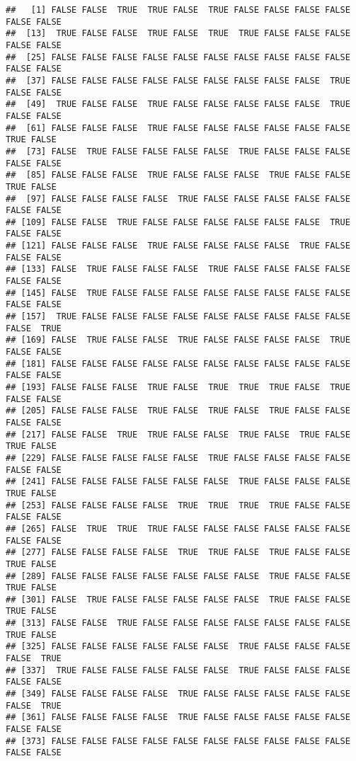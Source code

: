 \documentclass[
]{book}
\begin{document}
\begin{verbatim}
##   [1] FALSE FALSE  TRUE  TRUE FALSE  TRUE FALSE FALSE FALSE FALSE FALSE FALSE
##  [13]  TRUE FALSE FALSE  TRUE FALSE  TRUE  TRUE FALSE FALSE FALSE FALSE FALSE
##  [25] FALSE FALSE FALSE FALSE FALSE FALSE FALSE FALSE FALSE FALSE FALSE FALSE
##  [37] FALSE FALSE FALSE FALSE FALSE FALSE FALSE FALSE FALSE  TRUE FALSE FALSE
##  [49]  TRUE FALSE FALSE  TRUE FALSE FALSE FALSE FALSE FALSE  TRUE FALSE FALSE
##  [61] FALSE FALSE FALSE  TRUE FALSE FALSE FALSE FALSE FALSE FALSE  TRUE FALSE
##  [73] FALSE  TRUE FALSE FALSE FALSE FALSE  TRUE FALSE FALSE FALSE FALSE FALSE
##  [85] FALSE FALSE FALSE  TRUE FALSE FALSE FALSE  TRUE FALSE FALSE  TRUE FALSE
##  [97] FALSE FALSE FALSE FALSE  TRUE FALSE FALSE FALSE FALSE FALSE FALSE FALSE
## [109] FALSE FALSE  TRUE FALSE FALSE FALSE FALSE FALSE FALSE  TRUE FALSE FALSE
## [121] FALSE FALSE FALSE  TRUE FALSE FALSE FALSE FALSE  TRUE FALSE FALSE FALSE
## [133] FALSE  TRUE FALSE FALSE FALSE  TRUE FALSE FALSE FALSE FALSE FALSE FALSE
## [145] FALSE  TRUE FALSE FALSE FALSE FALSE FALSE FALSE FALSE FALSE FALSE FALSE
## [157]  TRUE FALSE FALSE FALSE FALSE FALSE FALSE FALSE FALSE FALSE FALSE  TRUE
## [169] FALSE  TRUE FALSE FALSE  TRUE FALSE FALSE FALSE FALSE  TRUE FALSE FALSE
## [181] FALSE FALSE FALSE FALSE FALSE FALSE FALSE FALSE FALSE FALSE FALSE FALSE
## [193] FALSE FALSE FALSE  TRUE FALSE  TRUE  TRUE  TRUE FALSE  TRUE FALSE FALSE
## [205] FALSE FALSE FALSE  TRUE FALSE  TRUE FALSE  TRUE FALSE FALSE FALSE FALSE
## [217] FALSE FALSE  TRUE  TRUE FALSE FALSE  TRUE FALSE  TRUE FALSE  TRUE FALSE
## [229] FALSE FALSE FALSE FALSE FALSE  TRUE FALSE FALSE FALSE FALSE FALSE FALSE
## [241] FALSE FALSE FALSE FALSE FALSE FALSE  TRUE FALSE FALSE FALSE  TRUE FALSE
## [253] FALSE FALSE FALSE FALSE  TRUE  TRUE  TRUE  TRUE FALSE FALSE FALSE FALSE
## [265] FALSE  TRUE  TRUE  TRUE FALSE FALSE FALSE FALSE FALSE FALSE FALSE FALSE
## [277] FALSE FALSE FALSE FALSE  TRUE  TRUE FALSE  TRUE FALSE FALSE  TRUE FALSE
## [289] FALSE FALSE FALSE FALSE FALSE FALSE FALSE  TRUE FALSE FALSE  TRUE FALSE
## [301] FALSE  TRUE FALSE FALSE FALSE FALSE FALSE  TRUE FALSE FALSE  TRUE FALSE
## [313] FALSE FALSE  TRUE FALSE FALSE FALSE FALSE FALSE FALSE FALSE  TRUE FALSE
## [325] FALSE FALSE FALSE FALSE FALSE FALSE  TRUE FALSE FALSE FALSE FALSE  TRUE
## [337]  TRUE FALSE FALSE FALSE FALSE FALSE  TRUE FALSE FALSE FALSE FALSE FALSE
## [349] FALSE FALSE FALSE FALSE  TRUE FALSE FALSE FALSE FALSE FALSE FALSE  TRUE
## [361] FALSE FALSE FALSE FALSE  TRUE FALSE FALSE FALSE FALSE FALSE FALSE FALSE
## [373] FALSE FALSE FALSE FALSE FALSE FALSE FALSE FALSE FALSE FALSE FALSE FALSE

\end{verbatim}
\end{document}
